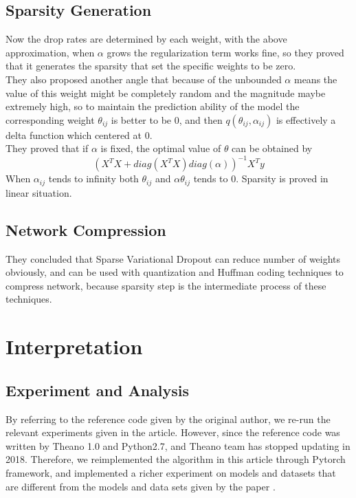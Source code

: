 \documentclass{article}
\begin{document}
	\subsection{Sparsity Generation}
	Now the drop rates are determined by each weight, with the above approximation, when $\alpha$ grows the regularization term works fine, so they proved that it generates the sparsity that set the specific weights to be zero.\\
	They also proposed another angle that because of the unbounded $\alpha$ means the value of this weight might be completely random and the magnitude maybe extremely high, so to maintain the prediction ability of the model the corresponding weight $\theta_{ij}$ is better to be $0$, and then $q(\theta_{ij},\alpha_{ij})$ is effectively a delta function which centered at $0$.\\
	They proved that if $\alpha$ is fixed, the optimal value of $\theta$ can be obtained by
	\begin{equation}
	(X^TX+diag(X^TX)diag(\alpha))^{-1}X^Ty
	\label{eq6}
	\end{equation}
	When $\alpha_{ij}$ tends to infinity both $\theta_{ij}$ and $\alpha\theta_{ij}$ tends to $0$. Sparsity is proved in linear situation.
	
	\subsection{Network Compression}
	They concluded that Sparse Variational Dropout can reduce number of weights obviously, and can be used with quantization and Huffman coding techniques to compress network, because sparsity step is the intermediate process of these techniques.\\

	\section{Interpretation}

	\subsection{Experiment and Analysis}
	By referring to the reference code given by the original author, we re-run the relevant experiments given in the article. However, since the reference code was written by Theano 1.0 and Python2.7, and Theano team has stopped updating in 2018. Therefore, we reimplemented the algorithm in this article through Pytorch framework, and implemented a richer experiment on models and datasets that are different from the models and data sets given by the paper \cite{molchanov2017variational}.
\end{document}
